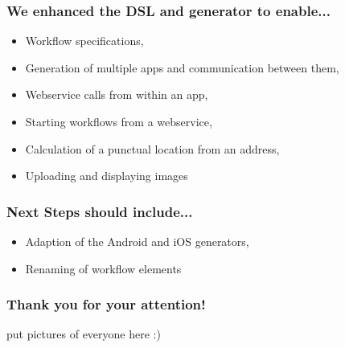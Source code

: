 \begin{frame}[t]
    \frametitle{We enhanced the DSL and generator to enable...}
    
    \begin{itemize}
    	\item Workflow specifications,
    	\item Generation of multiple apps and communication between them,
    	\item Webservice calls from within an app,
    	\item Starting workflows from a webservice,
    	\item Calculation of a punctual location from an address,
    	\item Uploading and displaying images
    \end{itemize}

\end{frame}

\begin{frame}[t]
    \frametitle{Next Steps should include...}

	\begin{itemize}
		\item Adaption of the Android and iOS generators,
		\item Renaming of workflow elements
	\end{itemize}
\end{frame}

\begin{frame}
\frametitle{Thank you for your attention!}

put pictures of everyone here :)
\end{frame}
